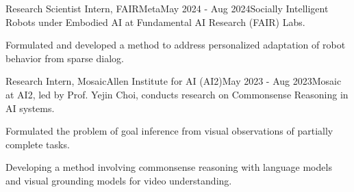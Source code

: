 
\begin{cventries}


\cventrylongwithdot
    {Research Scientist Intern, FAIR}{Meta}{May 2024 - Aug 2024}{Socially Intelligent Robots under Embodied AI at Fundamental AI Research (FAIR) Labs.}
    {
      \begin{cvitems}
        \item Formulated and developed a method to address personalized adaptation of robot behavior from sparse dialog.
      \end{cvitems}
    }
    
\cventrylongwithdot
    {Research Intern, Mosaic}{Allen Institute for AI (AI2)}{May 2023 - Aug 2023}{Mosaic at AI2, led by Prof. Yejin Choi, conducts research on Commonsense Reasoning in AI systems.}
    {
      \begin{cvitems}
        \item Formulated the problem of goal inference from visual observations of partially complete tasks. 
        \item Developing a method involving commonsense reasoning with language models and visual grounding models for video understanding.
      \end{cvitems}
    }





\end{cventries}

